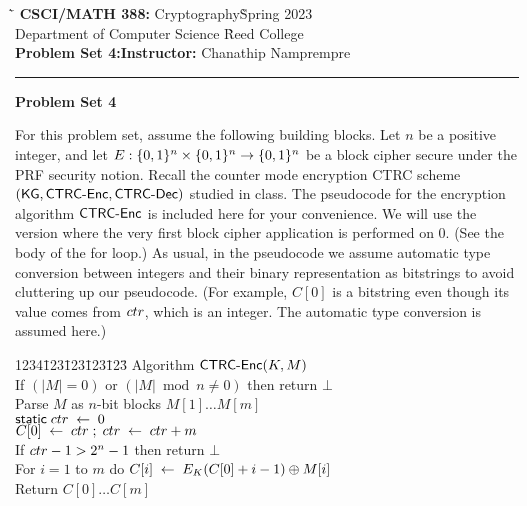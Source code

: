 \documentclass{exam}
\def\COURSENAME{Cryptography}
\def\COURSECODE{CSCI/MATH 388}
\def\YEAR{2023}
\begin{document}
\begin{tabbing}
  \`\=\kill
  \textbf{\COURSECODE:} \COURSENAME \` Spring \YEAR \\
  Department of Computer Science \` Reed College \\
  \textbf{Problem Set 4:}\` \textbf{Instructor:} Chanathip Namprempre
\end{tabbing}


\hrule

\vspace{.4in}

\begin{center}
\textbf{\Large Problem Set 4}
\end{center}


\vspace{.2in}

\noindent For this problem set, assume the following building blocks. Let $n$ be a positive integer, and let $E: \{0,1\}^n \times \{0,1\}^n \rightarrow \{0,1\}^n$ be a block cipher secure under the PRF security notion. Recall the counter mode encryption CTRC scheme $(\mathsf{KG},\mathsf{CTRC}\mbox{-}\mathsf{Enc},\mathsf{CTRC}\mbox{-}\mathsf{Dec})$ studied in class. The pseudocode for the encryption algorithm $\mathsf{CTRC}\mbox{-}\mathsf{Enc}$ is included here for your convenience. We will use the version where the very first block cipher application is performed on 0. (See the body of the for loop.) As usual, in the pseudocode we assume automatic type conversion between integers and their binary representation as bitstrings to avoid cluttering up our pseudocode. (For example, $C[0]$ is a bitstring even though its value comes from $ctr$, which is an integer. The automatic type conversion is assumed here.)

  \begin{tabbing}
    1234\=123\=123\=123\=123\=\kill
    Algorithm $\mathsf{CTRC}\mbox{-}\mathsf{Enc}(K,M)$ \\
    \> If $(|M| = 0)$ or $(|M| \bmod n \neq 0)$ then return $\bot$ \\
    \> Parse $M$ as $n$-bit blocks $M[1] \ldots M[m]$ \\
    \> $\mathsf{static} \; ctr \;\leftarrow\; 0$ \\
    \> $C[0] \;\leftarrow\; ctr \;;\;ctr \;\leftarrow\; ctr + m$ \\
    \> If $ctr -1 > 2^n-1$ then return $\bot$ \\
    \> For $i = 1$ to $m$ do $C[i] \;\leftarrow\;  E_K(C[0] + i - 1) \oplus M[i]$ \\
    \> Return $C[0]\ldots C[m]$
  \end{tabbing}
\end{document}
